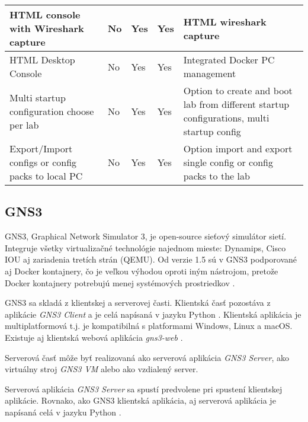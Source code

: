 \begin{longtable}{| m{3cm} | m{2cm} | m{2cm} | m{2cm} | m{4cm} |}
HTML console with Wireshark capture                   & No                & Yes             & Yes                  & HTML wireshark capture                                                                                        \\ \hline
HTML Desktop Console                                  & No                & Yes             & Yes                  & Integrated Docker PC management                                                                               \\ \hline
Multi startup configuration choose per lab            & No                & Yes             & Yes                  & Option to create and boot lab from different startup configurations, multi startup config                     \\ \hline
Export/Import configs or config packs to local PC     & No                & Yes             & Yes                  & Option import and export single config or config packs to the lab                                             \\ \hline  
\end{longtable}

\subsection{GNS3}

GNS3, Graphical Network Simulator 3, je open-source sieťový simulátor sietí. Integruje všetky virtualizačné technológie najednom mieste: Dynamips, Cisco IOU aj zariadenia tretích strán (QEMU). Od verzie 1.5 sú v GNS3 podporované aj Docker kontajnery, čo je veľkou výhodou oproti iným nástrojom, pretože Docker kontajnery potrebujú menej systémových prostriedkov \cite{gns3_docker}.

GNS3 sa skladá z klientskej a serverovej časti. Klientská časť pozostáva z aplikácie \emph{GNS3 Client} a je celá napísaná v jazyku Python \cite{gns3_gui_github}. Klientská aplikácia je multiplatformová t.j. je kompatibilná s platformami Windows, Linux a macOS. Existuje aj klientská webová aplikácia \emph{gns3-web} \cite{gns3_web_github}.

Serverová časť môže byť realizovaná ako serverová aplikácia \emph{GNS3 Server}, ako virtuálny stroj \emph{GNS3 VM} alebo ako vzdialený server.

Serverová aplikácia \emph{GNS3 Server} sa spustí predvolene pri spustení klientskej aplikácie. Rovnako, ako GNS3 klientská aplikácia, aj serverová aplikácia je napísaná celá v jazyku Python \cite{gns3_server_github}.


